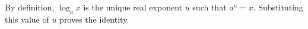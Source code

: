 By definition, $\log_ax$ is the unique real exponent $u$ such that $a^u=x$. Substituting this value of $u$ proves the identity.
